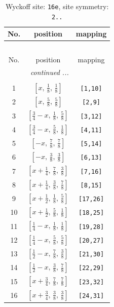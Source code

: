 \documentclass[fleqn,8pt]{jsarticle}
\begin{document}
\renewcommand{\arraystretch}{1.2}
\begin{longtable}{ccc}
\caption{Wyckoff site: {\tt 16e}, site symmetry: {\tt 2..}}
 \\
 \hline \hline
No. & position & mapping \\ \hline \endfirsthead

\multicolumn{2}{l}{\tablename\ \thetable{}} \\
 \hline \hline
No. & position & mapping \\ \hline \endhead

 \hline \hline
\multicolumn{2}{r}{\footnotesize\it continued ...} \\ \endfoot

 \hline \hline
\multicolumn{2}{r}{} \\ \endlastfoot

1 & $\left[ x,\, \frac{1}{8},\, \frac{1}{8} \right]$ & {\tt [1,10]} \\ \hline
2 & $\left[ x,\, \frac{5}{8},\, \frac{5}{8} \right]$ & {\tt [2,9]} \\ \hline
3 & $\left[ \frac{3}{4} - x,\, \frac{1}{8},\, \frac{5}{8} \right]$ & {\tt [3,12]} \\ \hline
4 & $\left[ \frac{3}{4} - x,\, \frac{5}{8},\, \frac{1}{8} \right]$ & {\tt [4,11]} \\ \hline
5 & $\left[ - x,\, \frac{7}{8},\, \frac{7}{8} \right]$ & {\tt [5,14]} \\ \hline
6 & $\left[ - x,\, \frac{3}{8},\, \frac{3}{8} \right]$ & {\tt [6,13]} \\ \hline
7 & $\left[ x + \frac{1}{4},\, \frac{7}{8},\, \frac{3}{8} \right]$ & {\tt [7,16]} \\ \hline
8 & $\left[ x + \frac{1}{4},\, \frac{3}{8},\, \frac{7}{8} \right]$ & {\tt [8,15]} \\ \hline
9 & $\left[ x + \frac{1}{2},\, \frac{1}{8},\, \frac{5}{8} \right]$ & {\tt [17,26]} \\ \hline
10 & $\left[ x + \frac{1}{2},\, \frac{5}{8},\, \frac{1}{8} \right]$ & {\tt [18,25]} \\ \hline
11 & $\left[ \frac{1}{4} - x,\, \frac{1}{8},\, \frac{1}{8} \right]$ & {\tt [19,28]} \\ \hline
12 & $\left[ \frac{1}{4} - x,\, \frac{5}{8},\, \frac{5}{8} \right]$ & {\tt [20,27]} \\ \hline
13 & $\left[ \frac{1}{2} - x,\, \frac{7}{8},\, \frac{3}{8} \right]$ & {\tt [21,30]} \\ \hline
14 & $\left[ \frac{1}{2} - x,\, \frac{3}{8},\, \frac{7}{8} \right]$ & {\tt [22,29]} \\ \hline
15 & $\left[ x + \frac{3}{4},\, \frac{7}{8},\, \frac{7}{8} \right]$ & {\tt [23,32]} \\ \hline
16 & $\left[ x + \frac{3}{4},\, \frac{3}{8},\, \frac{3}{8} \right]$ & {\tt [24,31]} \\
\end{longtable}
\end{document}
